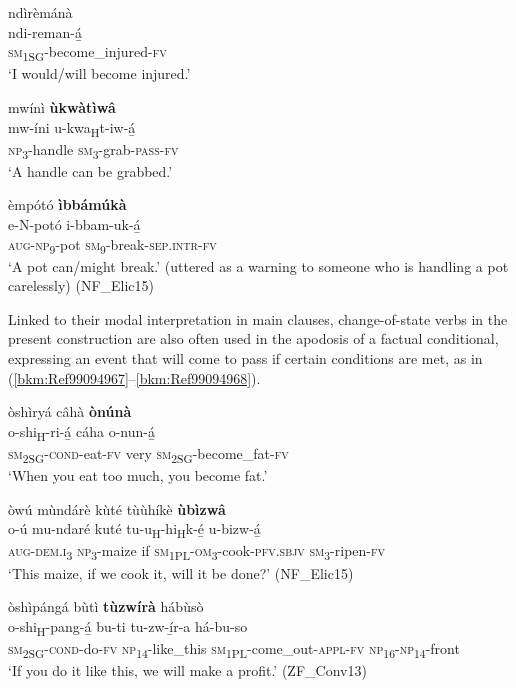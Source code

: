 \ea
\glll ndìrèmánà\\
ndi-reman-á̲\\
\textsc{sm}\textsubscript{1SG}-become\_injured-\textsc{fv}\\
\glt ‘I would/will become injured.’
\z

\ea
mwínì \textbf{ùkwàtìwâ}\\
\gll mw-íni  u-kwa\textsubscript{H}t-iw-á̲\\
\textsc{np}\textsubscript{3}-handle  \textsc{sm}\textsubscript{3}-grab-\textsc{pass}-\textsc{fv}\\
\glt ‘A handle can be grabbed.’
\z

\ea
\label{bkm:Ref75248624}
èmpótó \textbf{ìbbámúkà}\\
\gll e-N-potó  i-bbam-uk-á̲\\
\textsc{aug}-\textsc{np}\textsubscript{9}-pot  \textsc{sm}\textsubscript{9}-break-\textsc{sep}.\textsc{intr}-\textsc{fv}\\
\glt ‘A pot can/might break.’ (uttered as a warning to someone who is handling a pot carelessly) (NF\_Elic15)
\z

Linked to their modal interpretation in main clauses, change-of-state verbs in the present construction are also often used in the apodosis of a factual conditional, expressing an event that will come to pass if certain conditions are met, as in (\ref{bkm:Ref99094967}--\ref{bkm:Ref99094968}).

\ea
\label{bkm:Ref99094967}
òshìryá câhà \textbf{ònúnà}\\
\gll o-shi\textsubscript{H}-ri-á̲    cáha  o-nun-á̲\\
\textsc{sm}\textsubscript{2SG}-\textsc{cond}-eat-\textsc{fv}  very  \textsc{sm}\textsubscript{2SG}-become\_fat-\textsc{fv}\\
\glt ‘When you eat too much, you become fat.’
\z

\ea
òwú mùndárè kùté tùùhíkè \textbf{ùbìzwâ}\\
\gll o-ú    mu-ndaré  kuté  tu-u\textsubscript{H}-hi\textsubscript{H}k-é̲      u-bizw-á̲\\
\textsc{aug}-\textsc{dem}.\textsc{i}\textsubscript{3}  \textsc{np}\textsubscript{3}-maize  if  \textsc{sm}\textsubscript{1PL}-\textsc{om}\textsubscript{3}-cook-\textsc{pfv}.\textsc{sbjv}  \textsc{sm}\textsubscript{3}-ripen-\textsc{fv}\\
\glt ‘This maize, if we cook it, will it be done?’ (NF\_Elic15)
\z

\ea
\label{bkm:Ref99094968}
òshìpángá bùtì \textbf{tùzwírà} hábùsò\\
\gll o-shi\textsubscript{H}-pang-á̲  bu-ti tu-zw-í̲r-a      há-bu-so\\
\textsc{sm}\textsubscript{2SG}-\textsc{cond}-do-\textsc{fv}  \textsc{np}\textsubscript{14}-like\_this
\textsc{sm}\textsubscript{1PL}-come\_out-\textsc{appl}-\textsc{fv}  \textsc{np}\textsubscript{16}-\textsc{np}\textsubscript{14}-front\\
\glt ‘If you do it like this, we will make a profit.’ (ZF\_Conv13)
\z

